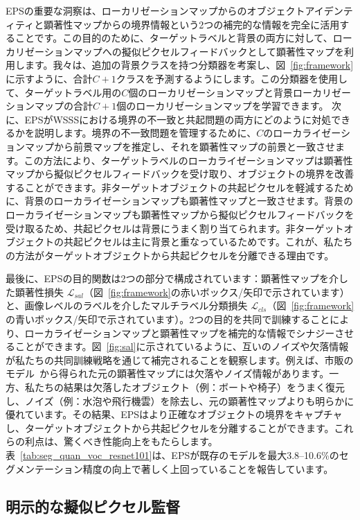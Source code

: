 \documentclass[final]{cvpr}
\begin{document}
EPSの重要な洞察は、ローカリゼーションマップからのオブジェクトアイデンティティと顕著性マップからの境界情報という2つの補完的な情報を完全に活用することです。この目的のために、ターゲットラベルと背景の両方に対して、ローカリゼーションマップへの擬似ピクセルフィードバックとして顕著性マップを利用します。我々は、追加の背景クラスを持つ分類器を考案し、図~\ref{fig:framework}に示すように、合計$C+1$クラスを予測するようにします。この分類器を使用して、ターゲットラベル用の$C$個のローカリゼーションマップと背景ローカリゼーションマップの合計$C+1$個のローカリゼーションマップを学習できます。
次に、EPSがWSSSにおける境界の不一致と共起問題の両方にどのように対処できるかを説明します。境界の不一致問題を管理するために、$C$のローカライゼーションマップから前景マップを推定し、それを顕著性マップの前景と一致させます。この方法により、ターゲットラベルのローカライゼーションマップは顕著性マップから擬似ピクセルフィードバックを受け取り、オブジェクトの境界を改善することができます。非ターゲットオブジェクトの共起ピクセルを軽減するために、背景のローカライゼーションマップも顕著性マップと一致させます。背景のローカライゼーションマップも顕著性マップから擬似ピクセルフィードバックを受け取るため、共起ピクセルは背景にうまく割り当てられます。非ターゲットオブジェクトの共起ピクセルは主に背景と重なっているためです。これが、私たちの方法がターゲットオブジェクトから共起ピクセルを分離できる理由です。

最後に、EPSの目的関数は2つの部分で構成されています：顕著性マップを介した{顕著性損失} $\mathcal{L}_{sal}$（図~\ref{fig:framework}の赤いボックス/矢印で示されています）と、画像レベルのラベルを介した{マルチラベル分類損失} $\mathcal{L}_{cls}$（図~\ref{fig:framework}の青いボックス/矢印で示されています）。2つの目的を共同で訓練することにより、ローカライゼーションマップと顕著性マップを補完的な情報でシナジーさせることができます。図~\ref{fig:sal}に示されているように、互いのノイズや欠落情報が私たちの共同訓練戦略を通じて補完されることを観察します。例えば、市販のモデル~\cite{hou2017deeply,nguyen2019deepusps,zhao2019pyramid}から得られた元の顕著性マップには欠落やノイズ情報があります。一方、私たちの結果は欠落したオブジェクト（例：ボートや椅子）をうまく復元し、ノイズ（例：水泡や飛行機雲）を除去し、元の顕著性マップよりも明らかに優れています。その結果、EPSはより正確なオブジェクトの境界をキャプチャし、ターゲットオブジェクトから共起ピクセルを分離することができます。これらの利点は、驚くべき性能向上をもたらします。表~\ref{tab:seg_quan_voc_resnet101}は、EPSが既存のモデルを最大3.8--10.6\%のセグメンテーション精度の向上で著しく上回っていることを報告しています。

\subsection{明示的な擬似ピクセル監督}\label{section3.2}
\end{document}

